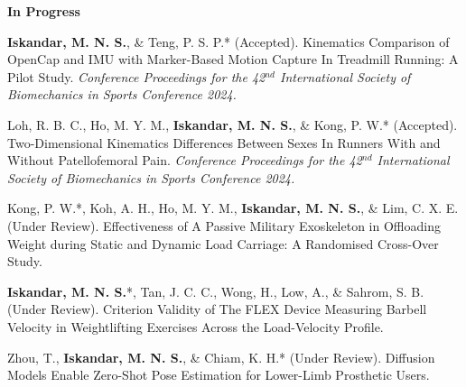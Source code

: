 \documentclass[../main.tex]{subfiles}
\begin{document}
        \textbf{In Progress}
        \def\labelprefix{P}
        \begin{etaremune}
            \item\label{conference: isbs2024opencap} {\textbf{Iskandar, M. N. S.}, \& Teng, P. S. P.* (Accepted). Kinematics Comparison of OpenCap and IMU with Marker-Based Motion Capture In Treadmill Running: A Pilot Study. \textit{Conference Proceedings for the 42$^{nd}$ International Society of Biomechanics in Sports Conference 2024.}}
            
            \item\label{conference: isbs2024raystudy} Loh, R. B. C., Ho, M. Y. M., {\textbf{Iskandar, M. N. S.}, \& Kong, P. W.* (Accepted). Two-Dimensional Kinematics Differences Between Sexes In Runners With and Without Patellofemoral Pain. \textit{Conference Proceedings for the 42$^{nd}$ International Society of Biomechanics in Sports Conference 2024.}}

            \item\label{article: spm exoskeleton}{Kong, P. W.*, Koh, A. H., Ho, M. Y. M., \textbf{Iskandar, M. N. S.}, \& Lim, C. X. E. (Under Review). Effectiveness of A Passive Military Exoskeleton in Offloading Weight during Static and Dynamic Load Carriage: A Randomised Cross-Over Study.}
            
            \item\label{article: fyp}{\textbf{Iskandar, M. N. S.}*, Tan, J. C. C., Wong, H., Low, A., \& Sahrom, S. B. (Under Review). Criterion Validity of The FLEX Device Measuring Barbell Velocity in Weightlifting Exercises Across the Load-Velocity Profile.}
            
            \item\label{article: diffusion_openpose}{Zhou, T., \textbf{Iskandar, M. N. S.}, \& Chiam, K. H.* (Under Review). Diffusion Models Enable Zero-Shot Pose Estimation for Lower-Limb Prosthetic Users. \href{https://arxiv.org/abs/2312.07854}{\faFilePdfO}}
        \end{etaremune}
        
  \resumeSubHeadingListEnd
\end{document}
